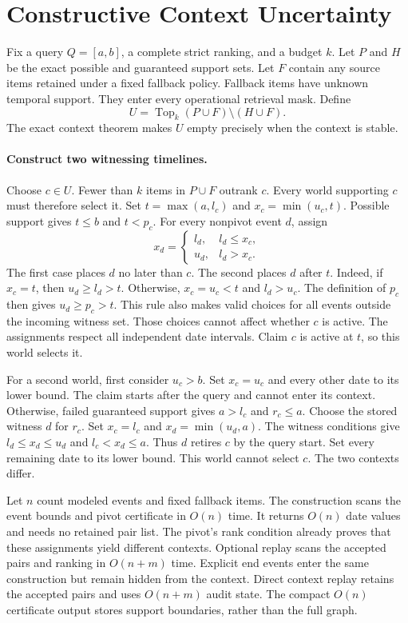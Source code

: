 \section{Constructive Context Uncertainty}
\label{app:refinement}

Fix a query $Q=[a,b]$, a complete strict ranking, and a budget $k$.
Let $P$ and $H$ be the exact possible and guaranteed support sets.
Let $F$ contain any source items retained under a fixed fallback policy.
Fallback items have unknown temporal support.
They enter every operational retrieval mask.
Define
\[
 U=\operatorname{Top}_k(P\cup F)\setminus(H\cup F).
\]
The exact context theorem makes $U$ empty precisely when the context is stable.

\paragraph{Construct two witnessing timelines.}
Choose $c\in U$.
Fewer than $k$ items in $P\cup F$ outrank $c$.
Every world supporting $c$ must therefore select it.
Set $t=\max(a,l_c)$ and $x_c=\min(u_c,t)$.
Possible support gives $t\le b$ and $t<p_c$.
For every nonpivot event $d$, assign
\[
 x_d=\begin{cases}
 l_d,&l_d\le x_c,\\
 u_d,&l_d>x_c.
 \end{cases}
\]
The first case places $d$ no later than $c$.
The second places $d$ after $t$.
Indeed, if $x_c=t$, then $u_d\ge l_d>t$.
Otherwise, $x_c=u_c<t$ and $l_d>u_c$.
The definition of $p_c$ then gives $u_d\ge p_c>t$.
This rule also makes valid choices for all events outside the incoming witness set.
Those choices cannot affect whether $c$ is active.
The assignments respect all independent date intervals.
Claim $c$ is active at $t$, so this world selects it.

For a second world, first consider $u_c>b$.
Set $x_c=u_c$ and every other date to its lower bound.
The claim starts after the query and cannot enter its context.
Otherwise, failed guaranteed support gives $a>l_c$ and $r_c\le a$.
Choose the stored witness $d$ for $r_c$.
Set $x_c=l_c$ and $x_d=\min(u_d,a)$.
The witness conditions give $l_d\le x_d\le u_d$ and $l_c<x_d\le a$.
Thus $d$ retires $c$ by the query start.
Set every remaining date to its lower bound.
This world cannot select $c$.
The two contexts differ.

Let $n$ count modeled events and fixed fallback items.
The construction scans the event bounds and pivot certificate in $O(n)$ time.
It returns $O(n)$ date values and needs no retained pair list.
The pivot's rank condition already proves that these assignments yield different contexts.
Optional replay scans the accepted pairs and ranking in $O(n+m)$ time.
Explicit end events enter the same construction but remain hidden from the context.
Direct context replay retains the accepted pairs and uses $O(n+m)$ audit state.
The compact $O(n)$ certificate output stores support boundaries, rather than the full graph.


